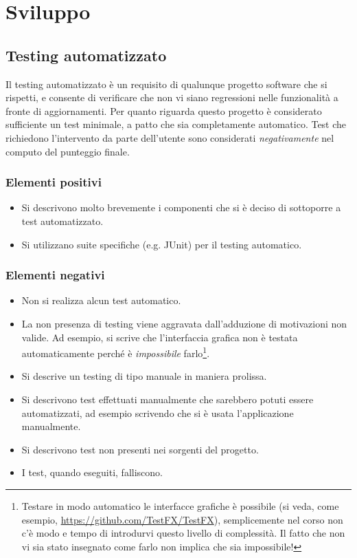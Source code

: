 \documentclass[a4paper,12pt]{report}
\begin{document}
\chapter{Sviluppo}
\section{Testing automatizzato}

Il testing automatizzato è un requisito di qualunque progetto software che si rispetti, e consente di verificare che non vi siano regressioni nelle funzionalità a fronte di aggiornamenti.
%
Per quanto riguarda questo progetto è considerato sufficiente un test minimale, a patto che sia completamente automatico.
%
Test che richiedono l'intervento da parte dell'utente sono considerati \textit{negativamente} nel computo del punteggio finale.

\subsection*{Elementi positivi}

\begin{itemize}
 \item Si descrivono molto brevemente i componenti che si è deciso di sottoporre a test automatizzato.
 \item Si utilizzano suite specifiche (e.g. JUnit) per il testing automatico.
\end{itemize}

\subsection*{Elementi negativi}
\begin{itemize}
 \item Non si realizza alcun test automatico.
 \item La non presenza di testing viene aggravata dall'adduzione di motivazioni non valide. Ad esempio, si scrive che l'interfaccia grafica non è testata automaticamente perché è \emph{impossibile} farlo\footnote{Testare in modo automatico le interfacce grafiche è possibile (si veda, come esempio, \url{https://github.com/TestFX/TestFX}), semplicemente nel corso non c'è modo e tempo di introdurvi questo livello di complessità. Il fatto che non vi sia stato insegnato come farlo non implica che sia impossibile!}.
 \item Si descrive un testing di tipo manuale in maniera prolissa.
 \item Si descrivono test effettuati manualmente che sarebbero potuti essere automatizzati, ad esempio scrivendo che si è usata l'applicazione manualmente.
 \item Si descrivono test non presenti nei sorgenti del progetto.
 \item I test, quando eseguiti, falliscono.
\end{itemize}
\end{document}

